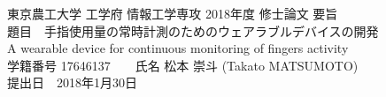 \thispagestyle{empty}
\begin{center}
	{\large 東京農工大学 工学府 情報工学専攻 2018年度 修士論文 要旨}\\
	\vspace{8mm}
	{\Large 題目　手指使用量の常時計測のためのウェアラブルデバイスの開発}\\
	\vspace{2mm}
	{\large A wearable device for continuous monitoring of fingers activity}\\
	\vspace{8mm}
	{\large 学籍番号 17646137　　氏名 松本 崇斗 (Takato MATSUMOTO)}\\
	\vspace{2mm}
	{\large 提出日　2018年1月30日}\\
	\vspace{4mm}
\end{center}













